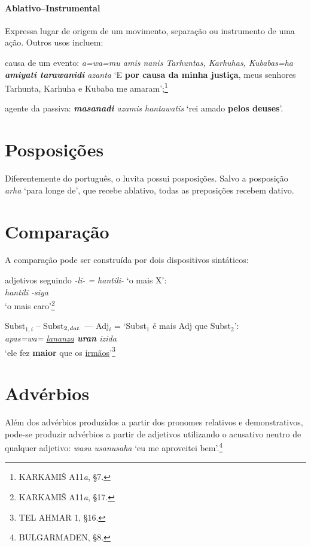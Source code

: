 \paragraph{Ablativo--Instrumental}
Expressa lugar de origem de um movimento, separação ou instrumento de uma ação.
Outros usos incluem:
\begin{inparaenum}[(a)]
	\item causa de um evento:
	\emph{a=wa=mu amis nanis Tarhuntas, Karhuhas, Kubabas=ha
		\textbf{amiyati tara\-wanidi} azanta}
	`E \textbf{por causa da minha justiça}, meus senhores Tarhunta, Kar\-huha e
	Kubaba me amaram';\footnote{KARKAMIŠ A11\emph{a}, §7.}
	\item agente da passiva: \emph{\textbf{masanadi} azamis hantawatis}
	`rei amado
	\textbf{pelos deuses}'.
\end{inparaenum}

\section{Posposições}
Diferentemente do português, o luvita possui posposições.
Salvo a posposição \emph{arha} `para longe de', que recebe ablativo, todas as
preposições recebem dativo.

\clearpage
\section{Comparação}\label{sec:Comparacao}
A comparação pode ser construída por dois dispositivos sintáticos:
\begin{compactenum}[(a)]
	\item adjetivos seguindo \emph{-li- = hantili-} `o mais X':\\
	\emph{hantili -siya}\\ `o mais caro'\footnote{KARKAMIŠ
		A11\emph{a}, §17.}
	\item Subst$_{1,i}$ -- Subst$_{2,\emph{dat.}}$ --- Adj$_i$ = `Subst$_1$ é mais Adj que Subst$_2$':\\
	\emph{apas=wa= \uline{lananza} \textbf{uran}  izida}\\
	`ele  fez \textbf{maior} que os \uline{irmãos}'\footnote{TEL
		AHMAR 1, §16.}
\end{compactenum}


\section{Advérbios}
Além dos advérbios produzidos a partir dos pronomes relativos e demonstrativos,
pode-se produzir advérbios a partir de adjetivos utilizando o acusativo neutro
de qualquer adjetivo: \emph{wasu usanusaha} `eu me aproveitei
bem'.\footnote{BULGARMADEN, §8.}


